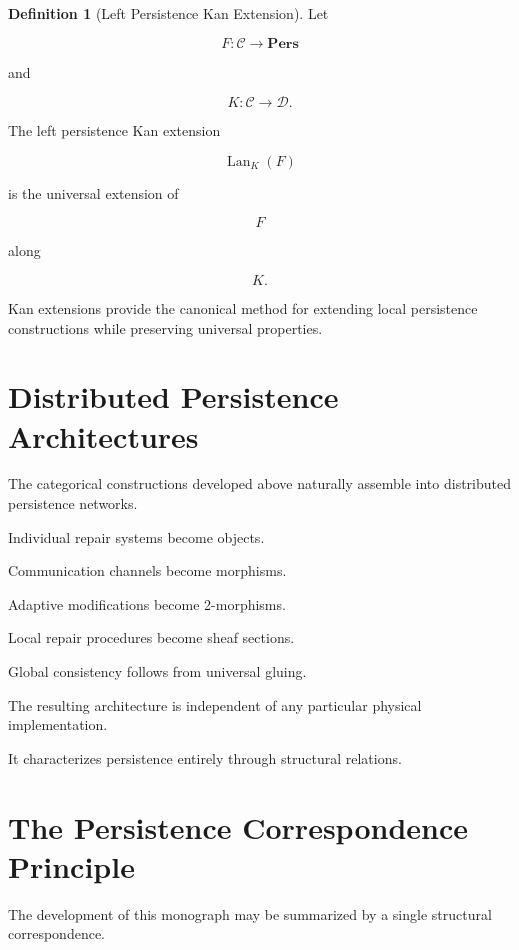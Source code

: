 \documentclass[11pt]{book}
\numberwithin{equation}{chapter}
\theoremstyle{definition}
\newtheorem{definition}{Definition}[chapter]
\theoremstyle{plain}
\begin{document}
\begin{definition}[Left Persistence Kan Extension]

Let

\[
F:
\mathcal C
\rightarrow
\mathbf{Pers}
\]

and

\[
K:
\mathcal C
\rightarrow
\mathcal D.
\]

The left persistence Kan extension

\[
\operatorname{Lan}_K(F)
\]

is the universal extension of

\[
F
\]

along

\[
K.
\]

\end{definition}

Kan extensions provide the canonical method for extending local
persistence constructions while preserving universal properties.

\section{Distributed Persistence Architectures}

The categorical constructions developed above naturally assemble into
distributed persistence networks.

Individual repair systems become objects.

Communication channels become morphisms.

Adaptive modifications become 2-morphisms.

Local repair procedures become sheaf sections.

Global consistency follows from universal gluing.

The resulting architecture is independent of any particular physical
implementation.

It characterizes persistence entirely through structural relations.

\section{The Persistence Correspondence Principle}

The development of this monograph may be summarized by a single
structural correspondence.
\end{document}
